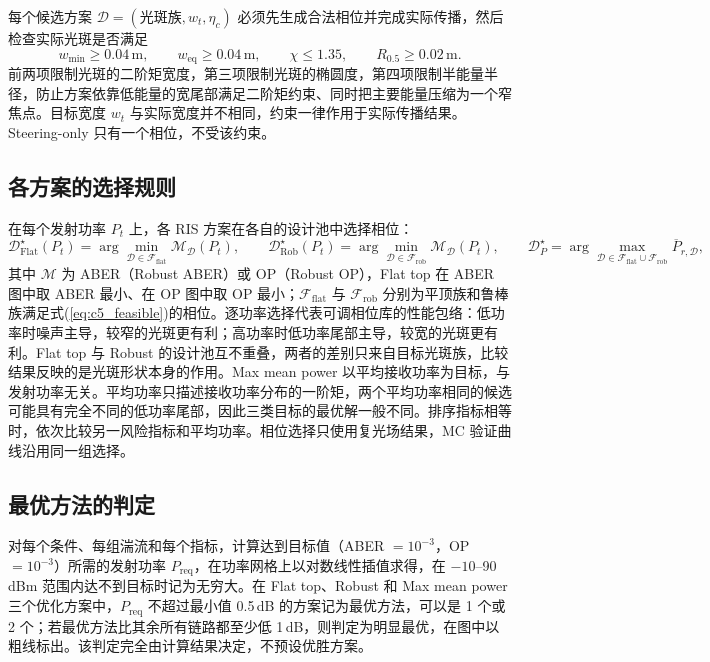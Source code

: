 每个候选方案 $\mathcal D=(\text{光斑族},w_t,\eta_c)$ 必须先生成合法相位并完成实际传播，然后检查实际光斑是否满足
\begin{equation}
w_{\mathrm{min}}\ge0.04\,\mathrm m,\qquad w_{\mathrm{eq}}\ge0.04\,\mathrm m,\qquad \chi\le1.35,\qquad R_{0.5}\ge0.02\,\mathrm m.
\label{eq:c5_feasible}
\end{equation}
前两项限制光斑的二阶矩宽度，第三项限制光斑的椭圆度，第四项限制半能量半径，防止方案依靠低能量的宽尾部满足二阶矩约束、同时把主要能量压缩为一个窄焦点。目标宽度 $w_t$ 与实际宽度并不相同，约束一律作用于实际传播结果。Steering-only 只有一个相位，不受该约束。

\subsection{各方案的选择规则}

在每个发射功率 $P_t$ 上，各 RIS 方案在各自的设计池中选择相位：
\begin{equation}
\mathcal D_{\mathrm{Flat}}^\star(P_t)=\arg\min_{\mathcal D\in\mathcal F_{\mathrm{flat}}}\mathcal M_{\mathcal D}(P_t),\qquad
\mathcal D_{\mathrm{Rob}}^\star(P_t)=\arg\min_{\mathcal D\in\mathcal F_{\mathrm{rob}}}\mathcal M_{\mathcal D}(P_t),\qquad
\mathcal D_P^\star=\arg\max_{\mathcal D\in\mathcal F_{\mathrm{flat}}\cup\mathcal F_{\mathrm{rob}}}\overline P_{r,\mathcal D},
\label{eq:c5_objectives}
\end{equation}
其中 $\mathcal M$ 为 ABER（Robust ABER）或 OP（Robust OP），Flat top 在 ABER 图中取 ABER 最小、在 OP 图中取 OP 最小；$\mathcal F_{\mathrm{flat}}$ 与 $\mathcal F_{\mathrm{rob}}$ 分别为平顶族和鲁棒族满足式(\ref{eq:c5_feasible})的相位。逐功率选择代表可调相位库的性能包络：低功率时噪声主导，较窄的光斑更有利；高功率时低功率尾部主导，较宽的光斑更有利。Flat top 与 Robust 的设计池互不重叠，两者的差别只来自目标光斑族，比较结果反映的是光斑形状本身的作用。Max mean power 以平均接收功率为目标，与发射功率无关。平均功率只描述接收功率分布的一阶矩，两个平均功率相同的候选可能具有完全不同的低功率尾部，因此三类目标的最优解一般不同。排序指标相等时，依次比较另一风险指标和平均功率。相位选择只使用复光场结果，MC 验证曲线沿用同一组选择。

\subsection{最优方法的判定}

对每个条件、每组湍流和每个指标，计算达到目标值（ABER $=10^{-3}$，OP $=10^{-3}$）所需的发射功率 $P_{\mathrm{req}}$，在功率网格上以对数线性插值求得，在 $-10$--90\,dBm 范围内达不到目标时记为无穷大。在 Flat top、Robust 和 Max mean power 三个优化方案中，$P_{\mathrm{req}}$ 不超过最小值 0.5\,dB 的方案记为最优方法，可以是 1 个或 2 个；若最优方法比其余所有链路都至少低 1\,dB，则判定为明显最优，在图中以粗线标出。该判定完全由计算结果决定，不预设优胜方案。

